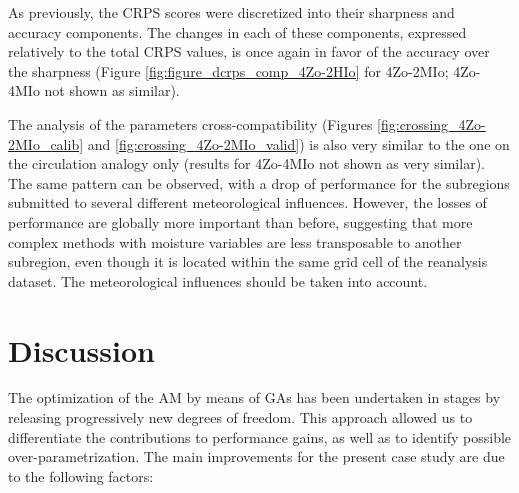 \documentclass[review]{elsarticle}
\begin{document}
As previously, the CRPS scores were discretized into their sharpness and accuracy components. The changes in each of these components, expressed relatively to the total CRPS values, is once again in favor of the accuracy over the sharpness (Figure \ref{fig:figure_dcrps_comp_4Zo-2HIo} for 4Zo-2MIo; 4Zo-4MIo not shown as similar).

The analysis of the parameters cross-compatibility (Figures \ref{fig:crossing_4Zo-2MIo_calib} and \ref{fig:crossing_4Zo-2MIo_valid}) is also very similar to the one on the circulation analogy only (results for 4Zo-4MIo not shown as very similar). The same pattern can be observed, with a drop of performance for the subregions submitted to several different meteorological influences. However, the losses of performance are globally more important than before, suggesting that more complex methods with moisture variables are less transposable to another subregion, even though it is located within the same grid cell of the reanalysis dataset. The meteorological influences should be taken into account.


\section{Discussion}
\label{sec:discussion}

The optimization of the AM by means of GAs has been undertaken in stages by releasing progressively new degrees of freedom. This approach allowed us to differentiate the contributions to performance gains, as well as to identify possible over-parametrization. The main improvements for the present case study are due to the following factors:
\end{document}
